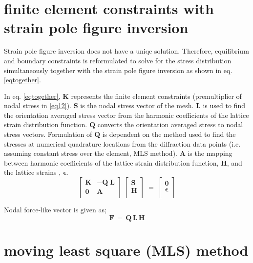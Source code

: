 \documentclass{article}
\begin{document}
\section{finite element constraints with strain pole figure inversion}\label{sectINV}
Strain pole figure inversion does not have a uniqe solution. Therefore, equilibrium and boundary constraints is reformulated to solve for the stress distribution simultaneously together with the strain pole figure inversion as shown in eq. \eqref{eqtogether}. 

In eq. \eqref{eqtogether}, $\mathbf{K}$ represents the finite element constraints (premultiplier of nodal stress in \eqref{eq12}). $\mathbf{S}$ is the nodal stress vector of the mesh. $\mathbf{L}$ is used to find the orientation averaged stress vector from the harmonic coefficients of the lattice strain distribution function. $\mathbf{Q}$ converts the orientation averaged stress to nodal stress vectors. Formulation of $\mathbf{Q}$ is dependent on the method used to find the stresses at numerical quadrature locations from the diffraction data points (i.e. assuming constant stress over the element, MLS method). $\mathbf{A}$ is the mapping between harmonic coefficients of the lattice strain distribution function, $\mathbf{H}$, and the lattice strains , $\mathbf{\epsilon}$.
\begin{equation}
\left[{ \begin{array}{cc}
	\mathbf{K} & -\mathbf{Q}\;\mathbf{L}  \\
		\mathbf{0} & \mathbf{A}  \\
\end{array}} \right]\; \left[{ \begin{array}{c}
		\mathbf{S}  \\
		\mathbf{H}   \\
\end{array}} \right] \;=\; \left[{ \begin{array}{c}
		\mathbf{0}  \\
		\mathbf{\epsilon}   \\
\end{array}} \right]
\label{eqtogether}
\end{equation}


Nodal force-like vector is given as;
\begin{equation}
\mathbf{F}  \,=\, \mathbf{Q} \, \mathbf{L} \, \mathbf{H}
\end{equation}

\section{moving least square (MLS) method}
\end{document}
